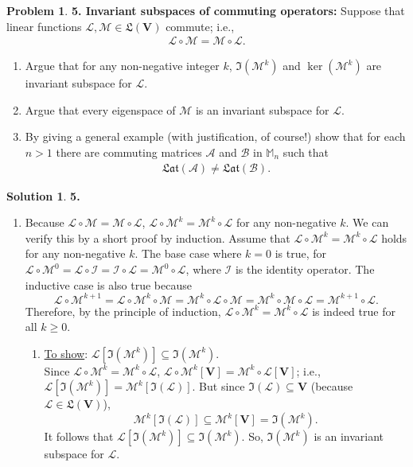 \documentclass{book}
\theoremstyle{definition}
\newtheorem*{prob*}{Problem}
\newtheorem*{sln*}{Solution}
\newcommand{\V}{\mathbf{V}}
\newcommand{\lag}{\mathcal{L}}
\newcommand{\M}{\mathcal{M}}
\begin{document}
\newpage


\begin{prob*} \textbf{5. Invariant subspaces of commuting operators:} Suppose that linear functions $\lag, \mathcal{M} \in \mathfrak{L}(\V)$ commute; i.e.,
	\begin{align*}
	\lag \circ \mathcal{M} = \mathcal{M}\circ \lag.
	\end{align*}
	\begin{enumerate}
		\item Argue that for any non-negative integer $k$, $\Im(\mathcal{M}^k)$ and $\ker(\mathcal{M}^k)$ are invariant subspace for $\lag$.
		\item Argue that every eigenspace of $\mathcal{M}$ is an invariant subspace for $\lag$.
		\item By giving a general example (with justification, of course!) show that for each $n>1$ there are commuting matrices $\mathcal{A}$ and $\mathcal{B}$ in $\mathbb{M}_n$ such that
		\begin{align*}
		\mathfrak{Lat}(\mathcal{A}) \neq \mathfrak{Lat}(\mathcal{B}).
		\end{align*}
	\end{enumerate}
	\begin{sln*}\textbf{5.}
		$\,$
		\begin{enumerate}
			\item Because $\lag \circ \M = \M \circ \lag$, $\lag \circ \M^k = \M^k \circ \lag$ for any non-negative $k$. We can verify this by a short proof by induction. Assume that $\lag \circ \M^k = \M^k \circ \lag$ holds for any non-negative $k$. The base case where $k=0$ is  true, for $\lag\circ \M^0 = \lag \circ \mathcal{I} = \mathcal{I} \circ \lag = \M^0 \circ \lag$, where $\mathcal{I}$ is the identity operator. The inductive case is also true because $$ \lag\circ \M^{k+1} = \lag \circ \M^k \circ \M = \M^k\circ\lag\circ\M = \M^k\circ \M \circ \lag = \M^{k+1}\circ \lag.$$ Therefore, by the principle of induction, $\lag \circ \M^k = \M^k \circ \lag$ is indeed true for all $k\geq 0$.
			
			\begin{enumerate}
				\item \underline{To show}: $\lag\left[ \Im(\M^k)\right] \subseteq \Im(\M^k)$.\\
				
				 Since $\lag\circ \M^k = \M^k \circ \lag$,  $\lag\circ \M^k[\V] = \M^k\circ\lag[\V]$; i.e., $\lag[\Im(\M^k)] = \M^k[\Im(\lag)]$. But since $\Im(\lag) \subseteq \V$ (because $\lag \in \mathfrak{L}(\V)$), $$\M^k[\Im(\lag)] \subseteq \M^k[\V] = \Im(\M^k).$$ It follows that $\lag[\Im(\M^k)] \subseteq \Im(\M^k)$. So, $\Im(\M^k)$ is an invariant subspace for $\lag$.\\
				

\end{enumerate}
\end{enumerate}
\end{sln*}
\end{prob*}
\end{document}

